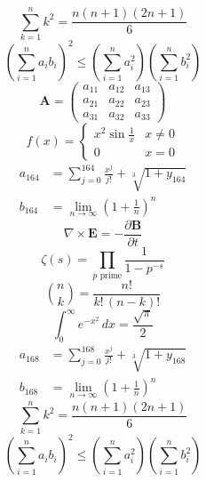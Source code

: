 \documentclass[11pt]{article}
\begin{document}
\begin{equation}
\sum_{k=1}^{n} k^2 = \frac{n(n+1)(2n+1)}{6}
\end{equation}
\begin{equation}
\left( \sum_{i=1}^n a_i b_i \right)^2 \le \left(\sum_{i=1}^n a_i^2\right)\left(\sum_{i=1}^n b_i^2\right)
\end{equation}
\begin{equation}
\mathbf{A} = \begin{pmatrix} a_{11} & a_{12} & a_{13} \\ a_{21} & a_{22} & a_{23} \\ a_{31} & a_{32} & a_{33} \end{pmatrix}
\end{equation}
\begin{equation}
f(x) = \begin{cases} x^2 \sin\frac{1}{x} & x \ne 0 \\ 0 & x = 0 \end{cases}
\end{equation}
\begin{align}
  a_{164} &= \sum_{j=0}^{164} \frac{x^j}{j!} + \sqrt[3]{1+y_{164}} \\
  b_{164} &= \lim_{n\to\infty} \left(1+\frac{1}{n}\right)^{n}
\end{align}
\begin{equation}
\nabla \times \mathbf{E} = -\frac{\partial \mathbf{B}}{\partial t}
\end{equation}
\begin{equation}
\zeta(s) = \prod_{p \text{ prime}} \frac{1}{1 - p^{-s}}
\end{equation}
\begin{equation}
\binom{n}{k} = \frac{n!}{k!\,(n-k)!}
\end{equation}
\begin{equation}
\int_0^\infty e^{-x^2}\,dx = \frac{\sqrt{\pi}}{2}
\end{equation}
\begin{align}
  a_{168} &= \sum_{j=0}^{168} \frac{x^j}{j!} + \sqrt[3]{1+y_{168}} \\
  b_{168} &= \lim_{n\to\infty} \left(1+\frac{1}{n}\right)^{n}
\end{align}
\begin{equation}
\sum_{k=1}^{n} k^2 = \frac{n(n+1)(2n+1)}{6}
\end{equation}
\begin{equation}
\left( \sum_{i=1}^n a_i b_i \right)^2 \le \left(\sum_{i=1}^n a_i^2\right)\left(\sum_{i=1}^n b_i^2\right)
\end{equation}
\end{document}
